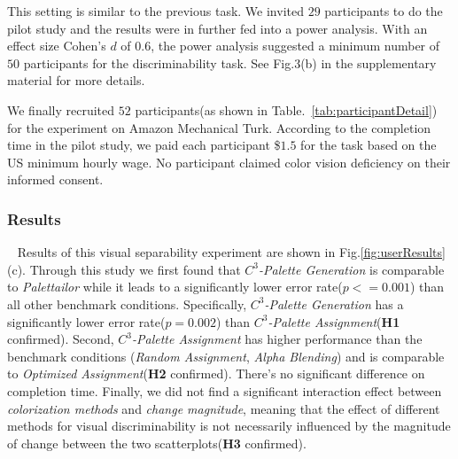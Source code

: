 \vspace{.3em}
This setting is similar to the previous task. We invited $29$ participants to do the pilot study and the results were in further fed into a power analysis. With an effect size Cohen's $d$ of $0.6$, the power analysis suggested a minimum number of $50$ participants for the discriminability task.  See Fig.3(b) in the supplementary material for more details.

\vspace{.3em}
We finally recruited $52$ participants(as shown in Table.~\ref{tab:participantDetail}) for the experiment on Amazon Mechanical Turk.
According to the completion time in the pilot study, we paid each participant \$$1.5$ for the task based on the US minimum hourly wage.
No participant claimed color vision deficiency on their informed consent.

\subsubsection{Results}
\
\newline
Results of this visual separability experiment are shown in Fig.\ref{fig:userResults} (c).
Through this study we first found that \emph{$C^3$-Palette Generation} is comparable to \emph{Palettailor} while it leads to a significantly lower error rate(\emph{$p<=0.001$}) than all other benchmark conditions. Specifically, \emph{$C^3$-Palette Generation} has a significantly lower error rate(\emph{$p=0.002$}) than \emph{$C^3$-Palette Assignment}(\textbf{H1} confirmed).
Second, \emph{$C^3$-Palette Assignment} has higher performance than the benchmark conditions (\emph{Random Assignment}, \emph{Alpha Blending}) and is comparable to \emph{Optimized Assignment}(\textbf{H2} confirmed). There's no significant difference on completion time.
Finally, we did not find a significant interaction effect between \emph{colorization methods} and \emph{change magnitude}, meaning that the effect of different methods for visual discriminability is not
necessarily influenced by the magnitude of change between the two scatterplots(\textbf{H3} confirmed).

